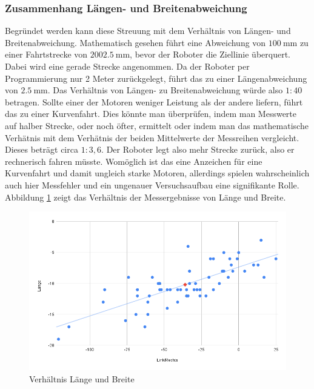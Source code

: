 \documentclass[ngerman]{tudscrreprt}
\begin{document}
\subsubsection{Zusammenhang Längen- und Breitenabweichung}
Begründet werden kann diese Streuung mit dem Verhältnis von Längen- und Breitenabweichung. 
Mathematisch gesehen führt eine Abweichung von $\SI{100}{\mm}$ zu einer Fahrtstrecke von
$\SI{2002,5}{\mm}$, bevor der Roboter die Ziellinie überquert. Dabei wird eine gerade
Strecke angenommen. Da der Roboter per Programmierung nur 2 Meter zurückgelegt, führt das
zu einer Längenabweichung von $\SI{2,5}{\mm}$. Das Verhältnis von Längen- zu
Breitenabweichung würde also $1:40$ betragen. Sollte einer der Motoren weniger Leistung
als der andere liefern, führt das zu einer Kurvenfahrt. Dies könnte man überprüfen, indem
man Messwerte auf halber Strecke, oder noch öfter, ermittelt oder indem man das
mathematische Verhätnis mit dem Verhätnis der beiden Mittelwerte der Messreihen
vergleicht. Dieses beträgt circa $1:3,6$. Der Roboter legt also mehr Strecke zurück, also
er rechnerisch fahren müsste. Womöglich ist das eine Anzeichen für eine Kurvenfahrt und
damit ungleich starke Motoren, allerdings spielen wahrscheinlich auch hier Messfehler und
ein ungenauer Versuchsaufbau eine signifikante Rolle. Abbildung 
\ref{figure:verhaeltnis_laenge_breite} zeigt das Verhältnis der Messergebnisse von Länge
und Breite.
%
\begin{figure}[H]
    \centering
    \includegraphics[scale=0.5]{src/charts/verhaeltnis_laenge_breite.png}
    \caption{Verhältnis Länge und Breite}
    \label{figure:verhaeltnis_laenge_breite}
\end{figure}
%
\end{document}
